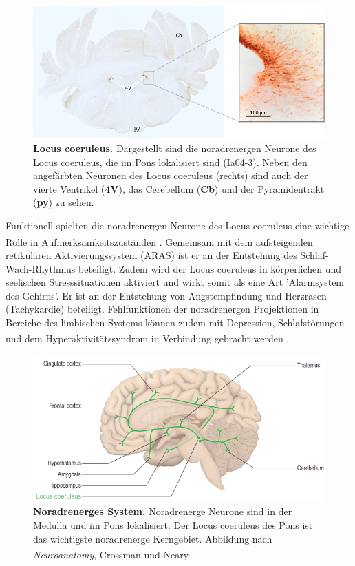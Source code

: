 \documentclass[12pt,a4paper,pdftex]{article}
\begin{document}
\begin{figure}[H]
    \centering
    \includegraphics[width=\textwidth]{pictures/Bilder_monoamine_systeme/locus_coeruleus.png}
    \caption[Locus coeruleus]{\textbf{Locus coeruleus.} Dargestellt sind die noradrenergen Neurone des Locus coeruleus, die im Pons lokalisiert sind (Ia04-3). Neben den angefärbten Neuronen des Locus coeruleus (rechts) sind auch der vierte Ventrikel (\textbf{4V}), das Cerebellum (\textbf{Cb}) und der Pyramidentrakt (\textbf{py}) zu sehen.}
    \label{fig:locus_coeruleus}
\end{figure}

Funktionell spielten die noradrenergen Neurone des Locus coeruleus eine wichtige Rolle in Aufmerksamkeitszuständen \textsuperscript{\cite[46]{kandel2013principles}}. Gemeinsam mit dem aufsteigenden retikulären Aktivierungssystem (ARAS) ist er an der Entstehung des Schlaf-Wach-Rhythmus beteiligt. Zudem wird der Locus coeruleus in körperlichen und seelischen Stresssituationen aktiviert und wirkt somit als eine Art 'Alarmsystem des Gehirns'. Er ist an der Entstehung von Angstempfindung und Herzrasen (Tachykardie) beteiligt. Fehlfunktionen der noradrenergen Projektionen in Bereiche des limbischen Systems können zudem mit Depression, Schlafstörungen und dem Hyperaktivitätssyndrom in Verbindung gebracht werden \textsuperscript{\cite[6]{trepel2011neuroanatomie}}.

\begin{figure}[H]
    \centering
    \includegraphics[width=\textwidth]{pictures/Bilder_monoamine_systeme/noradrenerges_system.PNG}
    \caption[Noradrenerges System]{\textbf{Noradrenerges System.} Noradrenerge Neurone sind in der Medulla und im Pons lokalisiert. Der Locus coeruleus des Pons ist das wichtigste noradrenerge Kerngebiet. Abbildung nach \textit{Neuroanatomy}, Crossman und Neary \textsuperscript{\cite[9]{crossman2014neuroanatomy}}.}
    \label{fig:noradrenerges_system}
\end{figure}{}
\end{document}

